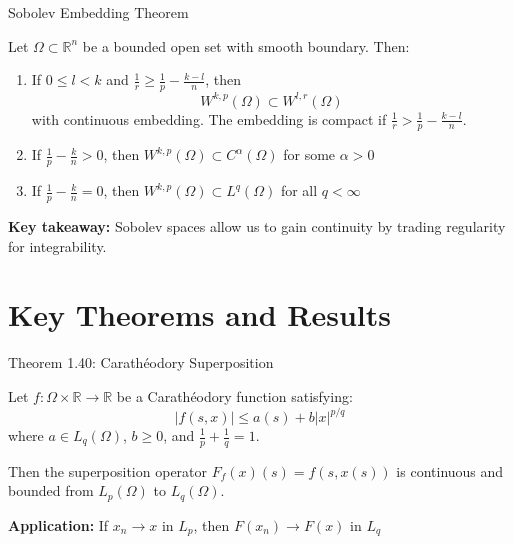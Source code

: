 \documentclass[aspectratio=169,10pt]{beamer}
\begin{document}
\begin{frame}{Sobolev Embedding Theorem}
    \begin{theorem}
        Let $\Omega \subset \mathbb{R}^n$ be a bounded open set with smooth boundary. Then:

        \begin{enumerate}
            \item If $0 \leq l < k$ and $\frac{1}{r} \geq \frac{1}{p} - \frac{k-l}{n}$, then
            \[
                W^{k,p}(\Omega) \subset W^{l,r}(\Omega)
            \]
            with continuous embedding. The embedding is compact if $\frac{1}{r} > \frac{1}{p} - \frac{k-l}{n}$.

            \item If $\frac{1}{p} - \frac{k}{n} > 0$, then $W^{k,p}(\Omega) \subset C^\alpha(\Omega)$ for some $\alpha > 0$

            \item If $\frac{1}{p} - \frac{k}{n} = 0$, then $W^{k,p}(\Omega) \subset L^q(\Omega)$ for all $q < \infty$
        \end{enumerate}
    \end{theorem}

    \vspace{0.3cm}
    \small
    \textbf{Key takeaway:} Sobolev spaces allow us to gain continuity by trading regularity for integrability.
\end{frame}

\section{Key Theorems and Results}

\begin{frame}{Theorem 1.40: Carathéodory Superposition}
    \begin{theorem}
        Let $f: \Omega \times \mathbb{R} \to \mathbb{R}$ be a Carathéodory function satisfying:
        \[
            |f(s, x)| \leq a(s) + b|x|^{p/q}
        \]
        where $a \in L_q(\Omega)$, $b \geq 0$, and $\frac{1}{p} + \frac{1}{q} = 1$.

        Then the superposition operator $F_f(x)(s) = f(s, x(s))$ is continuous and bounded from $L_p(\Omega)$ to $L_q(\Omega)$.
    \end{theorem}

    \vspace{0.3cm}
    \textbf{Application:} If $x_n \to x$ in $L_p$, then $F(x_n) \to F(x)$ in $L_q$
\end{frame}
\end{document}
